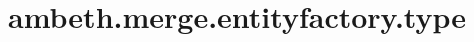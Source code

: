 \section{ambeth.merge.entityfactory.type}
\label{configuration:AmbethMergeEntityfactoryType}
\AvailableInJavaAndCsharp{\TODO}